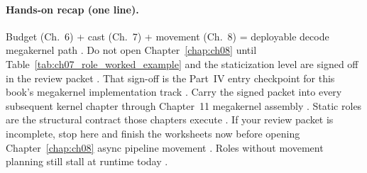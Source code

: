 \paragraph{Hands-on recap (one line).}
Budget (Ch.~6) + cast (Ch.~7) + movement (Ch.~8) = deployable decode megakernel path \citep{dao2022flashattention,shah2024flashattention3,semianalysis2024tma,yirage2026,mpk2025,patel2025llminference,taxbreak2026,memoryfloor2026,chen2020compilerbasedhardw,wu2024mirage}.
Do not open Chapter~\ref{chap:ch08} until Table~\ref{tab:ch07_role_worked_example} and the staticization level are signed off in the review packet \citep{yirage2026,shah2024flashattention3,patel2025llminference,nvidia2024cudagraphs,mpk2025,chen2020compilerbasedhardw,taxbreak2026}.
That sign-off is the Part~IV entry checkpoint for this book's megakernel implementation track \citep{mpk2025,wu2024mirage,dao2022flashattention,semianalysis2024tma,memoryfloor2026,patel2025llminference,yirage2026}.
Carry the signed packet into every subsequent kernel chapter through Chapter~11 megakernel assembly \citep{shah2024flashattention3,taxbreak2026,chen2020compilerbasedhardw,mpk2025,dao2022flashattention,patel2025llminference,yirage2026,wu2024mirage}.
Static roles are the structural contract those chapters execute \citep{mpk2025,semianalysis2024tma,memoryfloor2026,taxbreak2026,patel2025llminference}.
If your review packet is incomplete, stop here and finish the worksheets now before opening Chapter~\ref{chap:ch08} async pipeline movement \citep{semianalysis2024tma,dao2022flashattention}.
Roles without movement planning still stall at runtime today \citep{shah2024flashattention3,patel2025llminference,yirage2026}.

